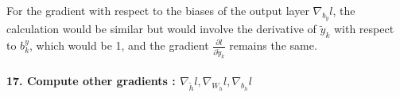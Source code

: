 \documentclass{article}
\theoremstyle{plain}%
\theoremstyle{definition}
\theoremstyle{remark}
\begin{document}
For the gradient with respect to the biases of the output layer \( \nabla_{b_y} l \), the calculation would be similar but would involve the derivative of \( \tilde{y}_k \) with respect to \( b_k^y \), which would be 1, and the gradient \( \frac{\partial l}{\partial \tilde{y}_k} \) remains the same.


\paragraph{17. Compute other gradients : $ \nabla _{\tilde{h}} l, \nabla _{W_h} l, \nabla_{b_h}l $ }
\end{document}
